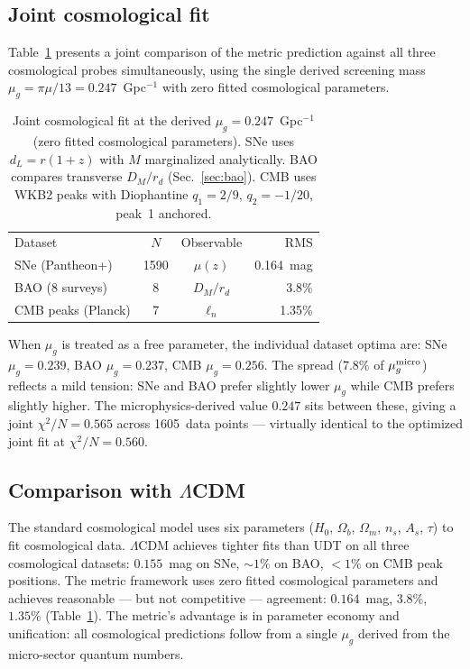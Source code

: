\documentclass[aps,prd,twocolumn,superscriptaddress,nofootinbib,longbibliography]{revtex4-2}
\newcommand{\mug}{\mu_g}
\begin{document}
\subsection{Joint cosmological fit}

Table~\ref{tab:joint} presents a joint comparison of
the metric prediction against all three cosmological probes
simultaneously, using the single derived screening mass
$\mug = \pi\mu/13 = 0.247$~Gpc$^{-1}$ with zero fitted cosmological
parameters.

\begin{table}[h]
\caption{\label{tab:joint}%
Joint cosmological fit at the derived $\mug = 0.247$~Gpc$^{-1}$
(zero fitted cosmological parameters).  SNe uses $d_L = r(1+z)$ with
$M$ marginalized analytically.  BAO compares transverse $D_M/r_d$
(Sec.~\ref{sec:bao}).  CMB uses WKB2 peaks with Diophantine
$q_1 = 2/9$, $q_2 = -1/20$, peak~1 anchored.}
\begin{ruledtabular}
\begin{tabular}{lccr}
Dataset & $N$ & Observable & RMS \\
\colrule
SNe (Pantheon+) & 1590 & $\mu(z)$ & 0.164~mag \\
BAO (8 surveys) & 8 & $D_M/r_d$ & 3.8\% \\
CMB peaks (Planck) & 7 & $\ell_n$ & 1.35\% \\
\end{tabular}
\end{ruledtabular}
\end{table}

When $\mug$ is treated as a free parameter, the individual dataset
optima are: SNe $\mug = 0.239$, BAO $\mug = 0.237$, CMB
$\mug = 0.256$.  The spread ($7.8\%$ of $\mug^{\rm micro}$)
reflects a mild tension: SNe and BAO prefer slightly lower $\mug$
while CMB prefers slightly higher.  The microphysics-derived value
$0.247$ sits between these, giving a joint $\chi^2/N = 0.565$ across
1605~data points --- virtually identical to the optimized joint fit
at $\chi^2/N = 0.560$.

\subsection{Comparison with $\Lambda$CDM}

The standard cosmological model uses six parameters
($H_0$, $\Omega_b$, $\Omega_m$, $n_s$, $A_s$, $\tau$) to fit
cosmological data.  $\Lambda$CDM achieves tighter fits than UDT on
all three cosmological datasets: $0.155$~mag on SNe, $\sim 1\%$ on
BAO, $< 1\%$ on CMB peak positions.  The metric framework uses zero
fitted cosmological parameters and achieves reasonable --- but not
competitive --- agreement: $0.164$~mag, $3.8\%$, $1.35\%$
(Table~\ref{tab:joint}).  The metric's advantage is in parameter
economy and unification: all cosmological predictions follow from a
single $\mug$ derived from the micro-sector quantum numbers.
\end{document}
